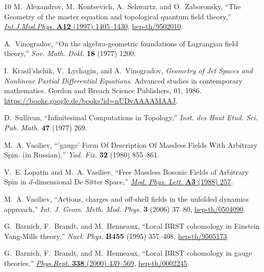 \documentclass[a4paper,12pt]{article}
\numberwithin{equation}{section} %
\begin{document}
\begin{thebibliography}{10}
M.~Alexandrov, M.~Kontsevich, A.~Schwartz, and O.~Zaboronsky, ``{T}he {G}eometry of the master equation and topological quantum field theory,'' \href{http://dx.doi.org/10.1142/S0217751X97001031}{{\em Int.J.Mod.Phys.} {\bfseries A12} (1997) 1405--1430},
\href{http://arxiv.org/abs/hep-th/9502010}{{\ttfamily hep-th/9502010}}.

A.~Vinogradov, ``{O}n the algebra-geometric foundations of {L}agrangian field theory,'' {\em Sov. Math. Dokl.} {\bfseries 18} (1977) 1200.

I.~Krasil'shchik, V.~Lychagin, and A.~Vinogradov, {\em Geometry of Jet Spaces and Nonlinear Partial Differential Equations}.
\newblock Advanced studies in contemporary mathematics. Gordon and Breach Science Publishers, 01, 1986.
\newblock \url{https://books.google.de/books?id=nUDvAAAAMAAJ}.

D.~Sullivan, ``{I}nfinitesimal {C}omputations in {T}opology,'' {\em Inst. des Haut Etud. Sci. Pub. Math.} {\bfseries 47} (1977) 269.

M.~A. Vasiliev, ``'gauge' {F}orm {O}f {D}escription {O}f {M}assless {F}ields {W}ith {A}rbitrary {S}pin. (in {R}ussian),''
{\em Yad. Fiz.} {\bfseries 32} (1980) 855--861.

V.~E. Lopatin and M.~A. Vasiliev, ``{Free Massless Bosonic Fields of Arbitrary Spin in $d$-dimensional De Sitter Space},''
\href{http://dx.doi.org/10.1142/S0217732388000313}{{\em Mod. Phys. Lett.} {\bfseries A3} (1988) 257}.

M.~A. Vasiliev, ``{A}ctions, charges and off-shell fields in the unfolded dynamics approach,'' {\em Int. J. Geom. Meth. Mod. Phys.} {\bfseries 3} (2006) 37--80,
\href{http://arxiv.org/abs/hep-th/0504090}{{\ttfamily hep-th/0504090}}.

G.~Barnich, F.~Brandt, and M.~Henneaux, ``{L}ocal {BRST} cohomology in {E}instein {Y}ang-{M}ills theory,'' {\em Nucl. Phys.} {\bfseries B455} (1995) 357--408,
\href{http://arxiv.org/abs/hep-th/9505173}{{\ttfamily hep-th/9505173}}.

G.~Barnich, F.~Brandt, and M.~Henneaux, ``{L}ocal {BRST} cohomology in gauge theories,'' \href{http://dx.doi.org/10.1016/S0370-1573(00)00049-1}{{\em Phys.Rept.} {\bfseries 338} (2000) 439--569},
\href{http://arxiv.org/abs/hep-th/0002245}{{\ttfamily hep-th/0002245}}.


\end{thebibliography}
\end{document}
